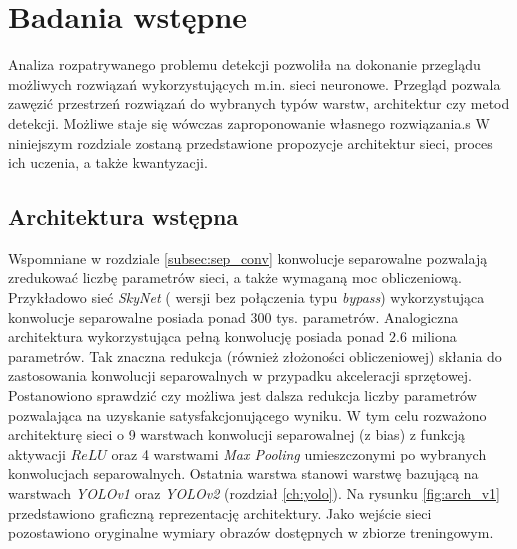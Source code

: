 \chapter{Badania wstępne}
\label{cha:Badania wstępne}

Analiza rozpatrywanego problemu detekcji pozwoliła na dokonanie przeglądu możliwych rozwiązań wykorzystujących m.in. sieci neuronowe.
Przegląd pozwala zawęzić przestrzeń rozwiązań do wybranych typów warstw, architektur czy metod detekcji. Możliwe staje się wówczas zaproponowanie własnego rozwiązania.s
W niniejszym rozdziale zostaną przedstawione propozycje architektur sieci, proces ich uczenia, a także kwantyzacji. 

\section{Architektura wstępna}

Wspomniane w rozdziale \ref{subsec:sep_conv} konwolucje separowalne pozwalają zredukować liczbę parametrów sieci, a także wymaganą moc obliczeniową.
Przykładowo sieć \emph{SkyNet} ( wersji bez połączenia typu \emph{bypass}) wykorzystująca konwolucje separowalne posiada ponad $300$ tys. parametrów. 
Analogiczna architektura wykorzystująca pełną konwolucję posiada ponad $2.6$ miliona parametrów.
Tak znaczna redukcja (również złożoności obliczeniowej) skłania do zastosowania konwolucji separowalnych w przypadku akceleracji sprzętowej. 
Postanowiono sprawdzić czy możliwa jest dalsza redukcja liczby parametrów pozwalająca na uzyskanie satysfakcjonującego wyniku.  
W tym celu rozważono architekturę sieci o 9 warstwach konwolucji separowalnej (z bias) z funkcją aktywacji $ReLU$ oraz  4 warstwami \emph{Max Pooling} umieszczonymi po wybranych konwolucjach separowalnych.
Ostatnia warstwa stanowi warstwę bazującą na warstwach \emph{YOLOv1} oraz \emph{YOLOv2} (rozdział \ref{ch:yolo}). 
Na rysunku \ref{fig:arch_v1} przedstawiono graficzną reprezentację architektury. 
Jako wejście sieci pozostawiono oryginalne wymiary obrazów dostępnych w zbiorze treningowym.

